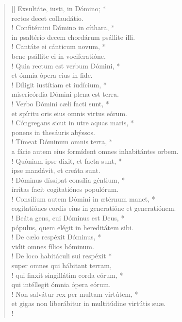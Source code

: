 \begin{verse}[\versewidth]
Exsultáte, iusti, in Dómino; *\\
rectos decet collaudátio.\\!
\vin Confitémini Dómino in cíthara, *\\
\vin in psaltério decem chordárum psállite illi.\\!
Cantáte ei cánticum novum, *\\
bene psállite ei in vociferatióne.\\!
\vin Quia rectum est verbum Dómini, *\\
\vin et ómnia ópera eius in fide.\\!
Díligit iustítiam et iudícium, *\\
misericórdia Dómini plena est terra.\\!
\vin Verbo Dómini cæli facti sunt, *\\
\vin et spíritu oris eius omnis virtus eórum.\\!
Cóngregans sicut in utre aquas maris, *\\
ponens in thesáuris abýssos.\\!
\vin Tímeat Dóminum omnis terra, *\\
\vin a fácie autem eius formídent omnes inhabitántes orbem.\\!
Quóniam ipse dixit, et facta sunt, *\\
ipse mandávit, et creáta sunt.\\!
\vin Dóminus díssipat consília géntium, *\\
\vin írritas facit cogitatiónes populórum.\\!
Consílium autem Dómini in ætérnum manet, *\\
cogitatiónes cordis eius in generatióne et generatiónem.\\!
\vin Beáta gens, cui Dóminus est Deus, *\\
\vin pópulus, quem elégit in hereditátem sibi.\\!
De cælo respéxit Dóminus, *\\
vidit omnes fílios hóminum.\\!
\vin De loco habitáculi sui respéxit *\\
\vin super omnes qui hábitant terram,\\!
qui finxit singillátim corda eórum, *\\
qui intéllegit ómnia ópera eórum.\\!
\vin Non salvátur rex per multam virtútem, *\\
\vin et gigas non liberábitur in multitúdine virtútis suæ.\\!

\end{verse}
